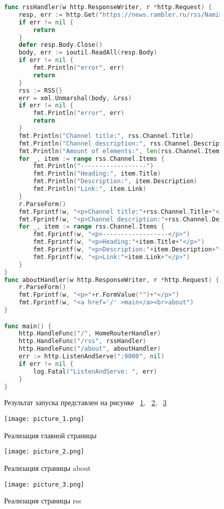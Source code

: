 \documentclass[a4paper, 14pt]{extarticle}
\begin{document}
\begin{figure}[!htb]
\begin{lstlisting}[language={go},caption={web.go(продолжение)},label={lst:code2}]
func rssHandler(w http.ResponseWriter, r *http.Request) {
	resp, err := http.Get("https://news.rambler.ru/rss/Namibia/")
	if err != nil {
		return
	}
	defer resp.Body.Close()
	body, err := ioutil.ReadAll(resp.Body)
	if err != nil {
		fmt.Println("error", err)
		return
	}
	rss := RSS{}
	err = xml.Unmarshal(body, &rss)
	if err != nil {
		fmt.Println("error", err)
		return
	}
	fmt.Println("Channel title:", rss.Channel.Title)
	fmt.Println("Channel description:", rss.Channel.Description)
	fmt.Println("Amount of elements:", len(rss.Channel.Items))
	for _, item := range rss.Channel.Items {
		fmt.Println("------------------")
		fmt.Println("Heading:", item.Title)
		fmt.Println("Description:", item.Description)
		fmt.Println("Link:", item.Link)
	}
	r.ParseForm()
	fmt.Fprintf(w, "<p>Channel title:"+rss.Channel.Title+"</p>")
	fmt.Fprintf(w, "<p>Channel description:"+rss.Channel.Description+"</p>")
	for _, item := range rss.Channel.Items {
		fmt.Fprintf(w, "<p>------------------</p>")
		fmt.Fprintf(w, "<p>Heading:"+item.Title+"</p>")
		fmt.Fprintf(w, "<p>Description:"+item.Description+"</p>")
		fmt.Fprintf(w, "<p>Link:"+item.Link+"</p>")
	}
}
func aboutHandler(w http.ResponseWriter, r *http.Request) {
	r.ParseForm()
	fmt.Fprintf(w, "<p>"+r.FormValue("")+"</p>")
	fmt.Fprintf(w, "<a href='/' >main</a><br>about") 
}

func main() {
	http.HandleFunc("/", HomeRouterHandler) 
	http.HandleFunc("/rss", rssHandler)
	http.HandleFunc("/about", aboutHandler)
	err := http.ListenAndServe(":9000", nil) 
	if err != nil {
		log.Fatal("ListenAndServe: ", err)
	}
}
\end{lstlisting}
\end{figure}

\begin{figure}[!htb]
Результат запуска представлен на рисунке ~\ref{fig:picture_1.png}, ~\ref{fig:picture_2.png}, ~\ref{fig:picture_3.png}
\end{figure}

\begin{figure}[!htb]
	\centering
	\texttt{[image: picture\_1.png]}
\caption{Реализация главной страницы}
\label{fig:picture_1.png}
\end{figure}

\begin{figure}[!htb]
	\centering
	\texttt{[image: picture\_2.png]}
\caption{Реализация страницы about}
\label{fig:picture_2.png}
\end{figure}

\begin{figure}[!htb]
	\centering
	\texttt{[image: picture\_3.png]}
\caption{Реализация страницы rss}
\label{fig:picture_3.png}
\end{figure}
\end{document}

